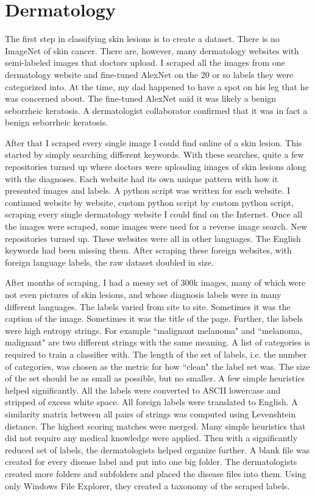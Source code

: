 \section{Dermatology}
The first step in classifying skin lesions is to create a dataset.  There is no ImageNet of skin cancer.  There are, however, many dermatology websites with semi-labeled images that doctors upload.  I scraped all the images from one dermatology website and fine-tuned AlexNet on the 20 or so labels they were categorized into.  At the time, my dad happened to have a spot on his leg that he was concerned about.  The fine-tuned AlexNet said it was likely a benign seborrheic keratosis.  A dermatologist collaborator confirmed that it was in fact a benign seborrheic keratosis.

After that I scraped every single image I could find online of a skin lesion.  This started by simply searching different keywords.  With these searches, quite a few repositories turned up where doctors were uploading images of skin lesions along with the diagnoses.  Each website had its own unique pattern with how it presented images and labels.  A python script was written for each website.  I continued website by website, custom python script by custom python script, scraping every single dermatology website I could find on the Internet.  Once all the images were scraped, some images were used for a reverse image search.  New repositories turned up.  These websites were all in other languages. The English keywords had been missing them.  After scraping these foreign websites, with foreign language labels, the raw dataset doubled in size.

After months of scraping, I had a messy set of 300k images, many of which were not even pictures of skin lesions, and whose diagnosis labels were in many different languages.  The labels varied from site to site.  Sometimes it was the caption of the image.  Sometimes it was the title of the page.  Further, the labels were high entropy strings.  For example ``malignant melanoma" and ``melanoma, malignant" are two different strings with the same meaning.  A list of categories is required to train a classifier with.  The length of the set of labels, i.e. the number of categories, was chosen as the metric for how ``clean" the label set was.  The size of the set should be as small as possible, but no smaller.  A few simple heuristics helped significantly. All the labels were converted to ASCII lowercase and stripped of excess white space.  All foreign labels were translated to English. A similarity matrix between all pairs of strings was computed using Levenshtein distance.  The highest scoring matches were merged.  Many simple heuristics that did not require any medical knowledge were applied.  Then with a significantly reduced set of labels, the dermatologists helped organize further.  A blank file was created for every disease label and put into one big folder.  The dermatologists created more folders and subfolders and placed the disease files into them.  Using only Windows File Explorer, they created a taxonomy of the scraped labels.

